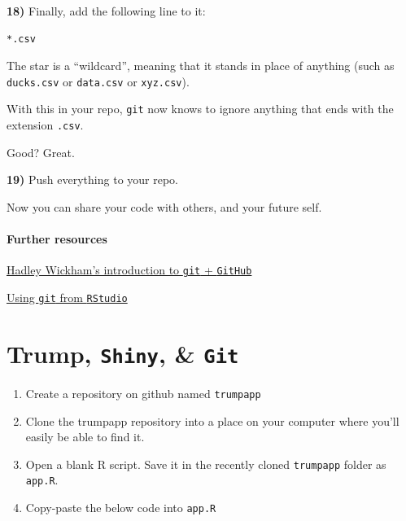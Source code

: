 \documentclass[
]{book}
\begin{document}
\textbf{18)} Finally, add the following line to it:

\begin{verbatim}
*.csv
\end{verbatim}

The star is a ``wildcard'', meaning that it stands in place of anything (such as \texttt{ducks.csv} or \texttt{data.csv} or \texttt{xyz.csv}).

With this in your repo, \texttt{git} now knows to ignore anything that ends with the extension \texttt{.csv}.

Good? Great.

\textbf{19)} Push everything to your repo.

Now you can share your code with others, and your future self.

\hypertarget{further-resources}{%
\subsubsection*{Further resources}\label{further-resources}}

\href{https://r-pkgs.org/git.html}{Hadley Wickham's introduction to \texttt{git} + \texttt{GitHub}}

\href{https://nceas.github.io/oss-lessons/version-control/4-getting-started-with-git-in-RStudio.html}{Using \texttt{git} from \texttt{RStudio}}

\hypertarget{trump-shiny-git}{%
\chapter{\texorpdfstring{Trump, \texttt{Shiny}, \& \texttt{Git}}{Trump, Shiny, \& Git}}\label{trump-shiny-git}}

\begin{enumerate}
\def\labelenumi{\arabic{enumi}.}
\item
  Create a repository on github named \texttt{trumpapp}
\item
  Clone the trumpapp repository into a place on your computer where you'll easily be able to find it.
\item
  Open a blank R script. Save it in the recently cloned \texttt{trumpapp} folder as \texttt{app.R}.
\item
  Copy-paste the below code into \texttt{app.R}
\end{enumerate}
\end{document}
